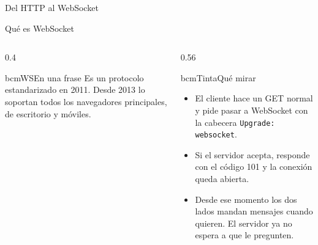 \begin{frame}{Del HTTP al WebSocket}
  \centering
\end{frame}

\begin{frame}{Qué es WebSocket}
  \begin{columns}[T]
    \begin{column}{0.4\textwidth}
      \begin{tarjeta}{bcmWS}{En una frase}
        \small Es un protocolo estandarizado en 2011. Desde 2013 lo soportan todos los navegadores
        principales, de escritorio y móviles.
      \end{tarjeta}
    \end{column}
    \begin{column}{0.56\textwidth}
      \begin{tarjeta}{bcmTinta}{Qué mirar}
        \small
        \begin{itemize}
          \item El cliente hace un GET normal y pide pasar a WebSocket con la cabecera
            \texttt{Upgrade: websocket}.
          \item Si el servidor acepta, responde con el código 101 y la conexión queda abierta.
          \item Desde ese momento los dos lados mandan mensajes cuando quieren. El servidor ya no espera
            a que le pregunten.
        \end{itemize}
      \end{tarjeta}
    \end{column}
  \end{columns}
  \vfill
  {\scriptsize\color{bcmGris}\cite[secc.~2.4]{Murley2021}\par}
\end{frame}

